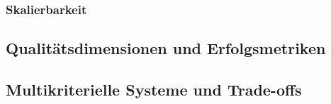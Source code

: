 \subsubsection{Skalierbarkeit}

\subsection{Qualitätsdimensionen und Erfolgsmetriken}

\subsection{Multikriterielle Systeme und Trade-offs}

